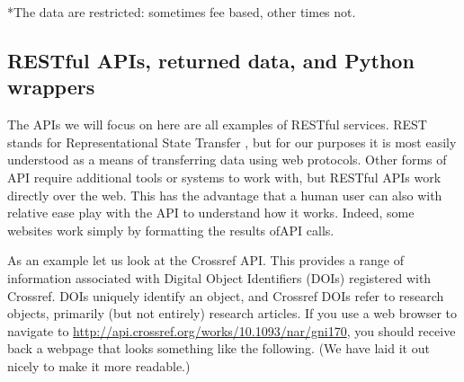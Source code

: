 \documentclass[]{krantz}
\begin{document}
*The data are restricted: sometimes fee based, other times not.

\subsection{RESTful APIs, returned data, and Python
wrappers}\label{restful-apis-returned-data-and-python-wrappers}

The APIs we will focus on here are all examples of RESTful services.
REST stands for Representational State Transfer
\citep{RESTwiki, fielding2002principled}, but for our purposes it is
most easily understood as a means of transferring data using web
protocols. Other forms of API require additional tools or systems to
work with, but RESTful APIs work directly over the web. This has the
advantage that a human user can also with relative ease play with the
API to understand how it works. Indeed, some websites work simply by
formatting the results ofAPI calls.

As an example let us look at the Crossref API. This provides a range of
information associated with Digital Object Identifiers (DOIs) registered
with Crossref. DOIs uniquely identify an object, and Crossref DOIs refer
to research objects, primarily (but not entirely) research articles. If
you use a web browser to navigate to
\url{http://api.crossref.org/works/10.1093/nar/gni170}, you should
receive back a webpage that looks something like the following. (We have
laid it out nicely to make it more readable.)
\end{document}
